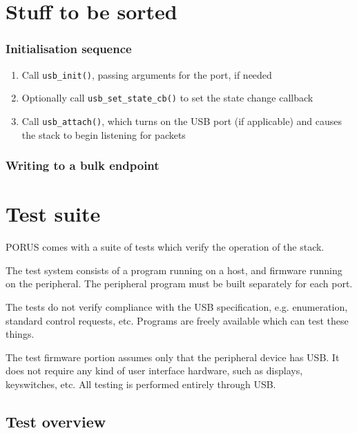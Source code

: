 \documentclass{book}
\newcommand{\ccode}[1]{\texttt{#1}}
\begin{document}

\chapter{Stuff to be sorted}

\subsection{Initialisation sequence}

\begin{enumerate}
\item Call \ccode{usb\_init()}, passing arguments for the port, if needed
\item Optionally call \ccode{usb\_set\_state\_cb()} to set the state change callback
\item Call \ccode{usb\_attach()}, which turns on the USB port (if applicable) and causes the stack to begin listening for packets
\end{enumerate}

\subsection{Writing to a bulk endpoint}


\chapter{Test suite}

PORUS comes with a suite of tests which verify the operation of the stack.

The test system consists of a program running on a host, and firmware running on the peripheral.  The peripheral program must be built separately for each port.

The tests do not verify compliance with the USB specification, e.g. enumeration, standard control requests, etc.  Programs are freely available which can test these things.

The test firmware portion assumes only that the peripheral device has USB.  It does not require any kind of user interface hardware, such as displays, keyswitches, etc.  All testing is performed entirely through USB.

\section{Test overview}
\end{document}
